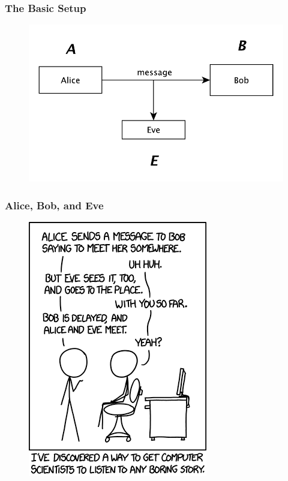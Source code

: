 \documentclass{beamer}
\newcommand{\<}{\langle}
\renewcommand{\>}{\rangle}
\begin{document}
\begin{frame}
\frametitle{The Basic Setup}

\begin{figure}
\includegraphics[scale=.8]{IMG/diag2.pdf}
\end{figure}
\end{frame}



\begin{frame}
\frametitle{Alice, Bob, and Eve}

\begin{figure}
\includegraphics[scale=.5]{IMG/comic2.png}
\end{figure}
\end{frame}
\end{document}
